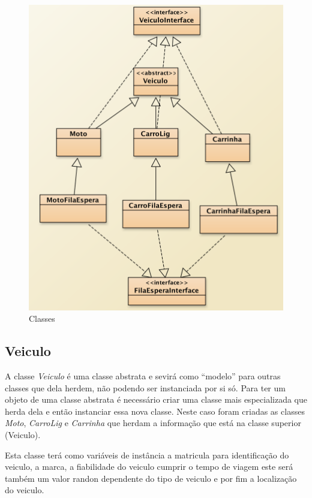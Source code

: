 \begin{figure}[htpb]
	\centering
	\includegraphics[scale=0.6]{imagem/veiculo}
	\caption{Classes }
	\label{p2:fig:p2_veiculos}
\end{figure}

\subsection{Veiculo}

A classe \textit{Veiculo} é uma classe abstrata e sevirá  como “modelo” para outras classes que dela herdem, não podendo ser instanciada por si só. Para ter um objeto de uma classe abstrata é necessário criar uma classe mais especializada que herda dela e então instanciar essa nova classe. Neste caso foram criadas as classes \textit{Moto}, \textit{CarroLig} e  \textit{Carrinha} que herdam a informação que está na classe superior (Veiculo).

Esta classe terá como variáveis de instância a matricula para identificação do veiculo, a marca, a fiabilidade do veiculo cumprir o tempo de viagem este será também um valor randon dependente do tipo de veiculo e por fim a localização do veiculo. 


